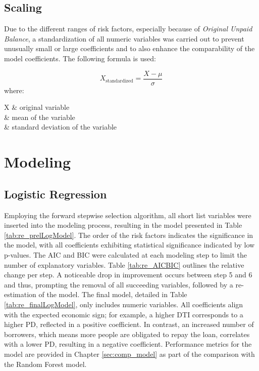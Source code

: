 \subsection{Scaling}
Due to the different ranges of risk factors, especially because of \emph{Original Unpaid Balance}, a standardization of all numeric variables was carried out to prevent unusually small or large coefficients and to also enhance the comparability of the model coefficients. The following formula is used:

\begin{equation}
X_{\text{standardized}} = \frac{X - \mu}{\sigma}
\end{equation}
where:
\begin{conditions}
 X  	& original variable \\
\mu		& mean of the variable \\
\sigma	& standard deviation of the variable
\end{conditions}

\section{Modeling}

\subsection{Logistic Regression}
Employing the forward stepwise selection algorithm, all short list variables were inserted into the modeling process, resulting in the model presented in Table \ref{tab:re_prelLogModel}. The order of the risk factors indicates the significance in the model, with all coefficients exhibiting statistical significance indicated by low p-values. The AIC and BIC were calculated at each modeling step to limit the number of explanatory variables. Table \ref{tab:re_AICBIC} outlines the relative change per step. A noticeable drop in improvement occurs between step 5 and 6 and thus, prompting the removal of all succeeding variables, followed by a re-estimation of the model. The final model, detailed in Table \ref{tab:re_finalLogModel}, only includes numeric variables. All coefficients align with the expected economic sign; for example, a higher DTI corresponds to a higher \acl{PD}, reflected in a positive coefficient. In contrast, an increased number of borrowers, which means more people are obligated to repay the loan, correlates with a lower \acl{PD}, resulting in a negative coefficient. Performance metrics for the model are provided in Chapter \ref{sec:comp_model} as part of the comparison with the Random Forest model.

